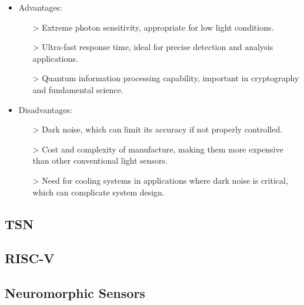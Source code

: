 \begin{itemize}
\item Advantages:
    \begin{itemize}
    \item[>] Extreme photon sensitivity, appropriate for low light conditions.
    \item[>] Ultra-fast response time, ideal for precise detection and analysis applications.
    \item[>] Quantum information processing capability, important in cryptography and fundamental science.
    \end{itemize}
\item Disadvantages:
    \begin{itemize}
    \item[>] Dark noise, which can limit its accuracy if not properly controlled.
    \item[>] Cost and complexity of manufacture, making them more expensive than other conventional light sensors.
    \item[>] Need for cooling systems in applications where dark noise is critical, which can complicate system design.
    \end{itemize}
\end{itemize}

\subsection{TSN}

\subsection{RISC-V}

\subsection{Neuromorphic Sensors}
